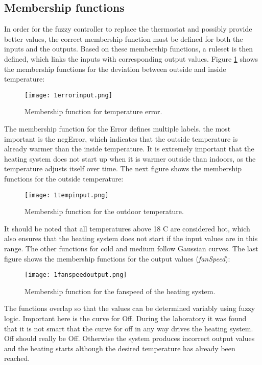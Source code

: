 \subsection{Membership functions}
In order for the fuzzy controller to replace the thermostat and possibly provide better values, the correct membership function must be defined for both the inputs and the outputs. Based on these membership functions, a ruleset is then defined, which links the inputs with corresponding output values. Figure \ref{errorinput} shows the membership functions for the deviation between outside and inside temperature:
\begin{figure}[H]
	\centering
	\texttt{[image: 1errorinput.png]}
	\caption[Caption for LOF]{Membership function for temperature error.}
	\label{errorinput}
\end{figure}
The membership function for the Error defines multiple labels. the most important is the negError, which indicates that the outside temperature is already warmer than the inside temperature. It is extremely important that the heating system does not start up when it is warmer outside than indoors, as the temperature adjusts itself over time. The next figure shows the membership functions for the outside temperature:
\begin{figure}[H]
	\centering
	\texttt{[image: 1tempinput.png]}
	\caption[Caption for LOF]{Membership function for the outdoor temperature.}
	\label{tempinput}
\end{figure}
It should be noted that all temperatures above 18 C are considered hot, which also ensures that the heating system does not start if the input values are in this range. The other functions for cold and medium follow Gaussian curves. The last figure shows the membership functions for the output values (\textit{fanSpeed}):
\begin{figure}[H]
	\centering
	\texttt{[image: 1fanspeedoutput.png]}
	\caption[Caption for LOF]{Membership function for the fanspeed of the heating system.}
	\label{fanspeedoutput}
\end{figure}
The functions overlap so that the values can be determined variably using fuzzy logic. Important here is the curve for Off. During the laboratory it was found that it is not smart that the curve for off in any way drives the heating system. Off should really be Off. Otherwise the system produces incorrect output values and the heating starts although the desired temperature has already been reached.

